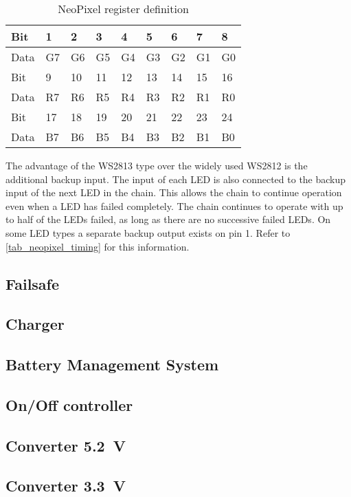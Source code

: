 \begin{table}[h!]
    \centering
    \begin{tabular}{|l|l|l|l|l|l|l|l|l|}
        \hline
        Bit     & 1  & 2  & 3  & 4  & 5  & 6  & 7  & 8  \\
        \hline
        Data    & G7 & G6 & G5 & G4 & G3 & G2 & G1 & G0 \\
        \hline
        \hline
        Bit     & 9  & 10 & 11 & 12 & 13 & 14 & 15 & 16 \\
        \hline
        Data    & R7 & R6 & R5 & R4 & R3 & R2 & R1 & R0 \\
        \hline
        \hline
        Bit     & 17 & 18 & 19 & 20 & 21 & 22 & 23 & 24 \\
        \hline
        Data    & B7 & B6 & B5 & B4 & B3 & B2 & B1 & B0 \\ 
        \hline
    \end{tabular}
    \caption{NeoPixel register definition}
    \label{tab_neopixel_register}
\end{table}

The advantage of the WS2813 type over the widely used WS2812 is the additional backup input. The input of each \ac{LED} is also connected to the backup input of the next \ac{LED} in the chain. This allows the chain to continue operation even when a \ac{LED} has failed completely. The chain continues to operate with up to half of the \acp{LED} failed, as long as there are no successive failed \acp{LED}. On some \ac{LED} types a separate backup output exists on pin 1. Refer to \autoref{tab_neopixel_timing} for this information. 

\subsection{Failsafe}
\label{sec_failsafe}

\subsection{Charger}
\label{sec_charger}

\subsection{Battery Management System}
\label{sec_bms}

\subsection{On/Off controller}
\label{sec_onoff}

\subsection{Converter \SI{5.2}{\volt}}
\label{sec_power_5V2}

\subsection{Converter \SI{3.3}{\volt}}
\label{sec_power_3V3}

